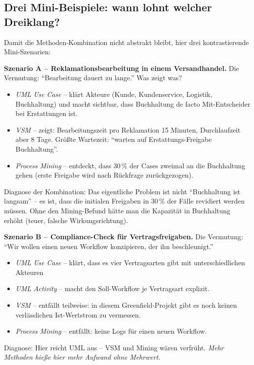 \documentclass[11pt,a4paper,oneside]{article}
\begin{document}
\subsection{Drei Mini-Beispiele: wann lohnt welcher Dreiklang?}

Damit die Methoden-Kombination nicht abstrakt bleibt, hier drei kontrastierende Mini-Szenarien:

\textbf{Szenario A -- Reklamationsbearbeitung in einem Versandhandel.} Die Vermutung: ``Bearbeitung dauert zu lange.'' Was zeigt was?
\begin{itemize}
  \item \emph{UML Use Case} -- klärt Akteure (Kunde, Kundenservice, Logistik, Buchhaltung) und macht sichtbar, dass Buchhaltung de facto Mit-Entscheider bei Erstattungen ist.
  \item \emph{VSM} -- zeigt: Bearbeitungszeit pro Reklamation 15 Minuten, Durchlaufzeit aber 8 Tage. Größte Wartezeit: ``warten auf Erstattungs-Freigabe Buchhaltung''.
  \item \emph{Process Mining} -- entdeckt, dass 30\,\% der Cases zweimal an die Buchhaltung gehen (erste Freigabe wird nach Rückfrage zurückgezogen).
\end{itemize}
Diagnose der Kombination: Das eigentliche Problem ist nicht ``Buchhaltung ist langsam'' -- es ist, dass die initialen Freigaben in 30\,\% der Fälle revidiert werden müssen. Ohne den Mining-Befund hätte man die Kapazität in Buchhaltung erhöht (teuer, falsche Wirkungsrichtung).

\textbf{Szenario B -- Compliance-Check für Vertragsfreigaben.} Die Vermutung: ``Wir wollen einen neuen Workflow konzipieren, der ihn beschleunigt.''
\begin{itemize}
  \item \emph{UML Use Case} -- klärt, dass es vier Vertragsarten gibt mit unterschiedlichen Akteuren%
  \item \emph{UML Activity} -- macht den Soll-Workflow je Vertragsart explizit.
  \item \emph{VSM} -- entfällt teilweise: in diesem Greenfield-Projekt gibt es noch keinen verlässlichen Ist-Wertstrom zu vermessen.
  \item \emph{Process Mining} -- entfällt: keine Logs für einen neuen Workflow.
\end{itemize}
Diagnose: Hier reicht UML aus -- VSM und Mining wären verfrüht. \emph{Mehr Methoden hieße hier mehr Aufwand ohne Mehrwert.}
\end{document}
